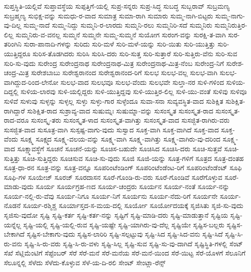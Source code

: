 {ಸುಪ್ತಸ್ಥಿತಿ-ಯಲ್ಲಿವೆ
ಸುಪ್ತಾವಸ್ಥೆಯ
ಸುಪ್ಪತ್ತಿಗೆ-ಯಲ್ಲಿ
ಸುಪ್ರ-ಸನ್ನರು
ಸುಪ್ರ-ಸಿದ್ಧ
ಸುಬದ್ಧ
ಸುಬ್ಬರಾವ್
ಸುಬ್ರಮಣ್ಯ
ಸುಬ್ರಹ್ಮಣ್ಯ
ಸುಭಿಕ್ಷ-ವನ್ನು
ಸುಮಧು-ರ-ವಾದ
ಸುಮಾತ್ರ
ಸುಮಾ-ರಾಗಿ
ಸುಮಾರು
ಸುಮ್ಮ-ನಾಗಿ-ಬಿಟ್ಟರು
ಸುಮ್ಮ-ನಾಗು-ವು-ದಿಲ್ಲ
ಸುಮ್ಮ-ನಾದೆ
ಸುಮ್ಮ-ನಿದ್ದು
ಸುಮ್ಮನಿ-ರ-ಲಾರದು
ಸುಮ್ಮನಿ-ರಲು
ಸುಮ್ಮನಿರಿ-ಸದೆ
ಸುಮ್ಮನಿರು
ಸುಮ್ಮನಿರುತ್ತಿರ-ಲಿಲ್ಲ
ಸುಮ್ಮನಿರು-ವ-ವನಲ್ಲ
ಸುಮ್ಮನೆ
ಸುಮ್ಮನೇ
ಸುಮ್ಮ-ಸುಮ್ಮನೆ
ಸುಯೋಗ
ಸುರಂಗ-ವನ್ನು
ಸುರಕ್ಷಿ-ತ-ವಾಗಿ
ಸುರ-ತರಿಂಗಿನಿ
ಸುರಾ-ಪಾನಾದಿ-ಗಳನ್ನು
ಸುರಿದು
ಸುರಿ-ಮಳೆ
ಸುರಿ-ಮಳೆ-ಯನ್ನು
ಸುರಿ-ಯಿತು
ಸುರಿ-ಯುತ್ತಿತ್ತು
ಸುರಿ-ಯುತ್ತಿದ್ದರೂ
ಸುರಿಸ-ತೊಡಗಿದರು
ಸುರಿಸಿ
ಸುರಿಸಿ-ದರು
ಸುರಿ-ಸುತ್ತ
ಸುರಿ-ಸುತ್ತಾರೆ
ಸುರಿ-ಸುತ್ತಿರು-ವೆನು
ಸುರಿ-ಸುವ
ಸುರಿ-ಸು-ವುದು
ಸುರೇಂದ್ರ
ಸುರೇಂದ್ರನಾಥ
ಸುರೇಂದ್ರನಾಥ-ಮಿತ್ರ
ಸುರೇಂದ್ರನಾಥ-ಮಿತ್ರ-ನೆಂಬ
ಸುರೇಂದ್ರ-ನಿಗೆ
ಸುರೇಶ-ಚಂದ್ರ-ಮಿತ್ರ
ಸುರೇಶಬಾಬು
ಸುರೇಶ್ವರಾನಂದ
ಸುರೇಶ್ವರಾನಂದ-ರಿಗೆ
ಸುಲಭ
ಸುಲಭ-ವಲ್ಲ
ಸುಲಭ-ವಾಗಿ
ಸುಲಭ-ವಾಗಿದ್ದುದ-ರಿಂದ-ಲೇನೋ
ಸುಲಭ-ವಾದ
ಸುಲಭವೂ
ಸುಲಭ-ವೆಂದು
ಸುಲಭವೇ
ಸುಲ್ತಾ-ನರ
ಸುಳಿ-ಗಳಿಂದ
ಸುಳಿಯ-ದಿದ್ದಲ್ಲಿ
ಸುಳಿಯ-ಲಾರವು
ಸುಳಿ-ಯಲ್ಲಿದ್ದರು
ಸುಳಿ-ಯುತ್ತಿದ್ದವು
ಸುಳಿ-ಯುತ್ತಿರ-ಲಿಲ್ಲ
ಸುಳಿ-ಯು-ವಂತೆ
ಸುಳಿವು
ಸುಳಿವೂ
ಸುಳಿವೆ
ಸುಳುವು
ಸುಳ್ಳನ್ನು
ಸುಳ್ಳಲ್ಲ
ಸುಳ್ಳು
ಸುಳ್ಳು-ಗಾರ
ಸುಳ್ಳೆಂದೂ
ಸುವಾ-ಸನಾ
ಸುವ್ಯವಸ್ಥಿತ-ವಾದ
ಸುಶಿಕ್ಷಿತ
ಸುಶಿಕ್ಷಿತ-ರಾಗಿದ್ದಾರೆ
ಸುಶಿಕ್ಷಿತ-ರಾದ
ಸುಶ್ರಾವ್ಯ-ವಾದ
ಸುಷುಮ್ನಃ
ಸುಷುಮ್ನಾ-ವನ್ನು
ಸುಸಂಸ್ಕೃತ
ಸುಸಂಸ್ಕೃತ-ರಾದ
ಸುಸಂಸ್ಕೃತ-ರಾದ-ವರೂ
ಸುಸಂಸ್ಕೃ-ತರು
ಸುಸಂಸ್ಕೃತ-ಳಾದ
ಸುಸಂಸ್ಕೃತ-ವಾಗಿತ್ತು
ಸುಸಂಸ್ಕೃತ-ವಾದ
ಸುಸಜ್ಜಿತ-ರಾಗಿರು-ವರು
ಸುಸಜ್ಜಿತ-ವಾದ
ಸುಸೂತ್ರ-ವಾಗಿ
ಸುಸ್ಪಷ್ಟ-ವಾಗು-ವುದು
ಸುಸ್ವಾದ
ಸೂಕ್ತ-ವಾಗಿ
ಸೂಕ್ತ-ವಾಗಿದೆ
ಸೂಕ್ತ-ವಾದ
ಸೂಕ್ತ-ವೆಂದು
ಸೂಕ್ಷ್ಮ
ಸೂಕ್ಷ್ಮದ
ಸೂಕ್ಷ್ಮ-ವಲಯ-ವನ್ನು
ಸೂಕ್ಷ್ಮ-ವಾಗಿ
ಸೂಕ್ಷ್ಮ-ವಾಗಿತ್ತು
ಸೂಕ್ಷ್ಮ-ವಾಗಿರು-ವು-ದರಿಂದ
ಸೂಕ್ಷ್ಮ-ವಾದ
ಸೂಕ್ಷ್ಮಾವಸ್ಥೆಗೆ
ಸೂಚನೆ
ಸೂಚನೆ-ಯನ್ನು
ಸೂಚಿಸ-ಬಹುದೇ
ಸೂಚಿಸಿದ
ಸೂಚಿಸಿ-ದರು
ಸೂಚಿ-ಸುತ್ತವೆ
ಸೂಚಿ-ಸುತ್ತಿತ್ತು
ಸೂಚಿ-ಸುತ್ತಿದ್ದರು
ಸೂಚಿಸುವ
ಸೂಚಿ-ಸು-ವುದು
ಸೂಜಿ
ಸೂಜಿ-ಯನ್ನು
ಸೂತ್ರ-ಗಳಿಗೆ
ಸೂತ್ರದ
ಸೂತ್ರ-ದಂತಹ
ಸೂತ್ರ-ಧಾ-ರನ
ಸೂತ್ರ-ವನ್ನು
ಸೂತ್ರ-ವನ್ನೂ
ಸೂಪರಿಂಟೆಂಡಿಂಗ್
ಸೂಪರಿಂಟೆಂಡೆಂಟ-ರಿಗೆ
ಸೂಪರಿಂಟೆಂಡೆಂಟ್
ಸೂಫಿ
ಸೂಫಿ-ಗಳ
ಸೂಯೇಜ್
ಸೂರಜ್
ಸೂರದಾಸನ
ಸೂರೆ-ಗೊಂಡಿ-ರು-ವರು
ಸೂರೆ-ಗೊಂಡಿವೆ
ಸೂರೆಗೊಳ್ಳುವ
ಸೂರೆ-ಮಾಡು-ವುದು
ಸೂರ್ಯ
ಸೂರ್ಯಗ್ರಹ-ಣದ
ಸೂರ್ಯ-ಚಂದ್ರರು
ಸೂರ್ಯನ
ಸೂರ್ಯ-ನಂತೆ
ಸೂರ್ಯ-ನನ್ನು
ಸೂರ್ಯ-ನಲ್ಲಿ-ರು-ವೆವು
ಸೂರ್ಯ-ನಿಗೂ
ಸೂರ್ಯ-ನಿಗೆ
ಸೂರ್ಯನು
ಸೂರ್ಯ-ನೆದು-ರಿಗೆ
ಸೂರ್ಯನೇ
ಸೂರ್ಯ-ನೊಡನೆ
ಸೂರ್ಯ-ರಶ್ಮಿಶ್ಚ
ಸೂರ್ಯಾಸ್ತದ-ಸ-ಮಯ-ದಲ್ಲಿ
ಸೂರ್ಯೋ
ಸೂರ್ಯೋದಯಕ್ಕೆ
ಸೃಜಿಸಿತು
ಸೃಜಿ-ಸು-ವುದು
ಸೃಜಿಸು-ವುದೋ
ಸೃಷ್ಟಿ
ಸೃಷ್ಟಿ-ಕರ್ತ
ಸೃಷ್ಟಿ-ಕರ್ತ-ನನ್ನು
ಸೃಷ್ಟಿಗೆ
ಸೃಷ್ಟಿ-ಮಾಡಿ-ದರು
ಸೃಷ್ಟಿ-ಮಾಡುತ್ತಾನೆ
ಸೃಷ್ಟಿಯ
ಸೃಷ್ಟಿ-ಯನ್ನೆಲ್ಲ
ಸೃಷ್ಟಿ-ಯಲ್ಲಿ
ಸೃಷ್ಟಿ-ಯಲ್ಲಿ-ರುವ
ಸೃಷ್ಟಿ-ಯಷ್ಟೇ
ಸೃಷ್ಟಿ-ಯಾಗಿರು-ವು-ದೆಲ್ಲ
ಸೃಷ್ಟಿಯೇ
ಸೃಷ್ಟಿಸ-ಬಲ್ಲರು
ಸೃಷ್ಟಿಸ-ಬೇಕಾಗಿದೆ
ಸೃಷ್ಟಿಸ-ಬೇಕಾಗು-ವುದು
ಸೃಷ್ಟಿಸ-ಲಾರಿರಿ
ಸೃಷ್ಟಿ-ಸಲ್ಪಟ್ಟುವು
ಸೃಷ್ಟಿ-ಸಿದ
ಸೃಷ್ಟಿ-ಸಿದ-ವನು
ಸೃಷ್ಟಿ-ಸಿದೆ
ಸೃಷ್ಟಿ-ಸಿ-ರು-ವನು
ಸೃಷ್ಟಿ-ಸಿ-ರು-ವರು
ಸೃಷ್ಟಿ-ಸಿ-ರು-ವಳು
ಸೃಷ್ಟಿ-ಸಿಲ್ಲ
ಸೃಷ್ಟಿ-ಸುವ
ಸೃಷ್ಟಿ-ಸು-ವು-ದಾಗಿದೆ
ಸೃಷ್ಟಿಸ್ಥಿತಿ-ಗಳಲ್ಲಿ
ಸೆಂಟ್
ಸೆಖೆ
ಸೆಟ್ಲಿಮೆಂಟಿಗೆ
ಸೆಪ್ಟೆಂಬರ್
ಸೆರೆ
ಸೆರೆ-ಮನೆ
ಸೆರೆ-ಮನೆಯ
ಸೆರೆ-ಮನೆ-ಯಿಂದ
ಸೆರೆ-ಯಿಟ್ಟ
ಸೆರೆ-ಯೊಳಗೆ
ಸೆಲೂನಿಗೆ
ಸೆಲೂನ್ನಲ್ಲಿ
ಸೆಳೆದು
ಸೆಳೆದು-ಕೊಳ್ಳುವ
ಸೆಳೆ-ಯ-ದಿ-ರಲಿ
ಸೇಂಟ್
ಸೇಂಟ್ಲಾ-ರೆನ್ಸ್
}

